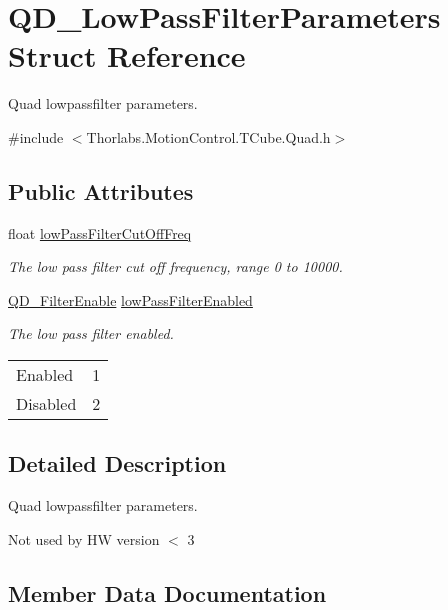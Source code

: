 \hypertarget{struct_q_d___low_pass_filter_parameters}{}\section{Q\+D\+\_\+\+Low\+Pass\+Filter\+Parameters Struct Reference}
\label{struct_q_d___low_pass_filter_parameters}


Quad lowpassfilter parameters.  




{\ttfamily \#include $<$Thorlabs.\+Motion\+Control.\+T\+Cube.\+Quad.\+h$>$}

\subsection*{Public Attributes}
\begin{DoxyCompactItemize}
\item 
float \hyperlink{struct_q_d___low_pass_filter_parameters_a86ece89720e25653389a4a6b11a5a025}{low\+Pass\+Filter\+Cut\+Off\+Freq}
\begin{DoxyCompactList}\small\item\em The low pass filter cut off frequency, range 0 to 10000. \end{DoxyCompactList}\item 
\hyperlink{group___t_cube_quad_gaf9cb69779549db4792c4e647b69eb29f}{Q\+D\+\_\+\+Filter\+Enable} \hyperlink{struct_q_d___low_pass_filter_parameters_a73065ea4d9e24f94d5a9802da69f06fe}{low\+Pass\+Filter\+Enabled}
\begin{DoxyCompactList}\small\item\em The low pass filter enabled. \tabulinesep=1mm
\begin{longtabu} spread 0pt [c]{*2{|X[-1]}|}
\hline
Enabled&1 \\
Disabled&2 \\
\end{longtabu}
\end{DoxyCompactList}\end{DoxyCompactItemize}


\subsection{Detailed Description}
Quad lowpassfilter parameters. 

Not used by HW version $<$ 3

\subsection{Member Data Documentation}
